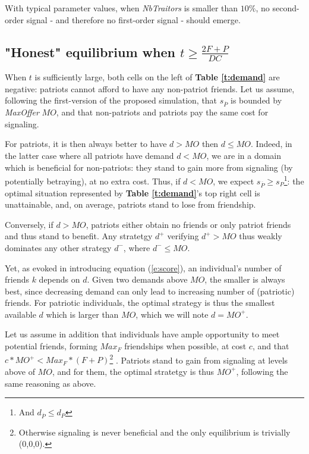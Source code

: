 \documentclass[a4paper,12pt]{report}
\begin{document}
With typical parameter values, when \emph{NbTraitors} is smaller than $10\%$, no second-order signal
- and therefore no first-order signal - should emerge.

\subsection{"Honest" equilibrium when $t \geq \frac{2F+P}{DC}$}
\label{s:h_ESS}

When $t$ is sufficiently large, both cells on the left of \textbf{Table \ref{t:demand}} 
are negative: patriots cannot afford to have any non-patriot friends. Let us assume, following the first-version of the proposed simulation, that $s_{\overline{P}}$ is
bounded by \emph{MaxOffer} $MO$, and that non-patriots and patriots pay the same cost
for signaling.

For patriots, it is then always better to have $d > MO$ then $d \leq MO$. Indeed, in the latter
case where all patriots have demand $d < MO$, we are in a domain which is beneficial
for non-patriots: they stand to gain more from signaling (by potentially betraying),
at no extra cost. Thus, if $d < MO$, we expect $s_{\overline{P}} 
\geq s_P$\footnote{And $d_{\overline{P}} \leq d_P$}: the optimal situation represented
by \textbf{Table \ref{t:demand}}'s top right cell is unattainable, and, on average, patriots
stand to lose from friendship.

Conversely, if $d > MO$, patriots either obtain no friends or only patriot friends and
thus stand to benefit. Any stratetgy $d^+$ verifying $d^+>MO$ thus weakly dominates any other strategy $d^-$,
where $d^- \leq MO$.

Yet, as evoked in introducing equation (\ref{e:score}), an individual's number of friends $k$
depends on $d$. Given two demands above $MO$, the smaller is always best, since decreasing 
demand can only lead to increasing number of (patriotic) friends. For patriotic individuals,
the optimal strategy is thus the smallest available $d$ which is larger than $MO$,
which we will note $d = MO^{+}$.


Let us assume in addition that individuals have ample opportunity to meet potential friends,
forming $Max_F$ friendships when possible, at cost $c$,
and that $c * MO^+ < Max_F * (F+P)$\footnote{Otherwise signaling is never beneficial
and the only equilibrium is trivially (0,0,0).} . 
Patriots stand to gain from signaling at levels above of $MO$, and for them,
the optimal stratetgy is thus $MO^{+}$, following the same reasoning as above.
\end{document}
